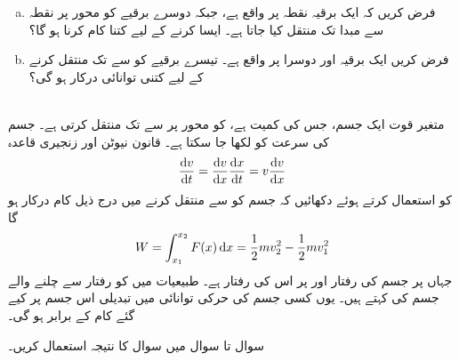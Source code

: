 \begin{enumerate}[a.]
\item
فرض کریں کہ ایک برقیہ نقطہ  پر واقع ہے، جبکہ دوسرے برقیے کو محور  پر نقطہ  سے مبدا تک منتقل کیا جاتا ہے۔ ایسا کرنے کے لیے کتنا کام کرنا ہو گا؟
\item
فرض کریں ایک برقیہ   اور دوسرا  پر واقع ہے۔ تیسرے برقیے  کو  سے  تک منتقل کرنے کے لیے کتنی توانائی درکار ہو گی؟
\end{enumerate}
\\
 متغیر قوت  ایک جسم،  جس کی کمیت  ہے، کو محور  پر   سے  تک  منتقل کرتی ہے۔ جسم کی سرعت  کو  لکھا جا سکتا ہے۔ قانون نیوٹن  اور زنجیری قاعدہ
\begin{align*}
\frac{\dif v}{\dif t}=\frac{\dif v}{\dif x}\frac{\dif x}{\dif t}=v\frac{\dif v}{\dif x}
\end{align*}
کو استعمال کرتے ہوئے  دکھائیں کہ  جسم کو  سے  منتقل کرنے میں درج ذیل کام درکار ہو گا
\begin{align*}
W=\int_{x_1}^{x_2} F(x)\dif x=\frac{1}{2}mv_2^2-\frac{1}{2}mv_1^2
\end{align*}
جہاں  پر جسم کی رفتار  اور  پر اس کی رفتار  ہے۔ طبیعیات  میں  کو رفتار  سے چلنے والے جسم کی  کہتے ہیں۔ یوں کسی جسم کی حرکی توانائی میں تبدیلی اس جسم پر کیے گئے کام کے برابر ہو گی۔

سوال  تا سوال  میں سوال  کا نتیجہ استعمال کریں۔

